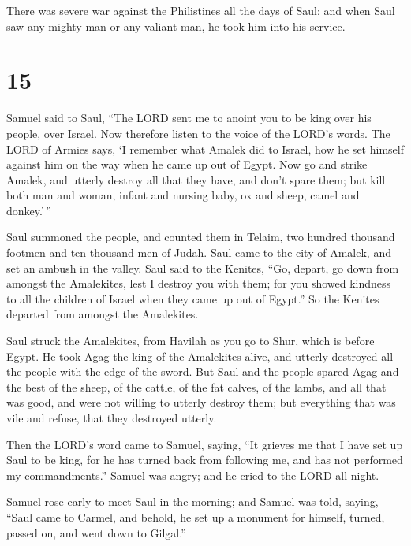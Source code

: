  There was severe war against the Philistines all the
days of Saul; and when Saul saw any mighty man or any valiant man, he
took him into his service.

\hypertarget{section-14}{%
\section{15}\label{section-14}}

 Samuel said to Saul, ``The LORD sent me to anoint you to
be king over his people, over Israel. Now therefore listen to the voice
of the LORD's words.  The LORD of Armies says, `I remember
what Amalek did to Israel, how he set himself against him on the way
when he came up out of Egypt.  Now go and strike Amalek,
and utterly destroy all that they have, and don't spare them; but kill
both man and woman, infant and nursing baby, ox and sheep, camel and
donkey.'\,''

 Saul summoned the people, and counted them in Telaim, two
hundred thousand footmen and ten thousand men of Judah. 
Saul came to the city of Amalek, and set an ambush in the valley.
 Saul said to the Kenites, ``Go, depart, go down from
amongst the Amalekites, lest I destroy you with them; for you showed
kindness to all the children of Israel when they came up out of Egypt.''
So the Kenites departed from amongst the Amalekites.

 Saul struck the Amalekites, from Havilah as you go to
Shur, which is before Egypt.  He took Agag the king of the
Amalekites alive, and utterly destroyed all the people with the edge of
the sword.  But Saul and the people spared Agag and the
best of the sheep, of the cattle, of the fat calves, of the lambs, and
all that was good, and were not willing to utterly destroy them; but
everything that was vile and refuse, that they destroyed utterly.

 Then the LORD's word came to Samuel, saying,
 ``It grieves me that I have set up Saul to be king, for
he has turned back from following me, and has not performed my
commandments.'' Samuel was angry; and he cried to the LORD all night.

 Samuel rose early to meet Saul in the morning; and
Samuel was told, saying, ``Saul came to Carmel, and behold, he set up a
monument for himself, turned, passed on, and went down to Gilgal.''

